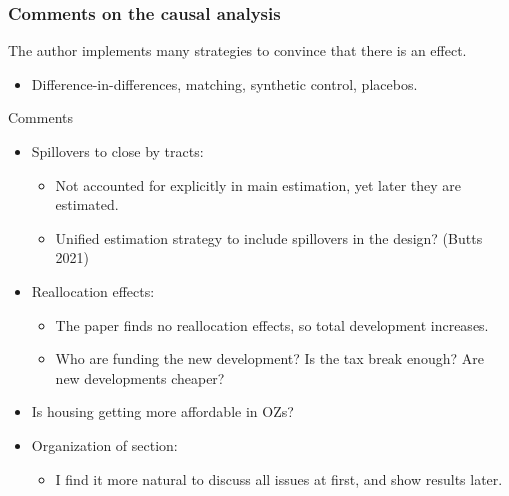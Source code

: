 \documentclass[aspectratio=169, t]{beamer}
\begin{document}
\begin{frame}
    \frametitle{Comments on the causal analysis}
    
    The author implements many strategies to convince that there is an effect.
    \begin{itemize}
        \item Difference-in-differences, matching, synthetic control, placebos.
    \end{itemize}

    \pause
    \vspace{2mm}
    Comments
    \begin{itemize}
        \vspace{1mm}
        \item Spillovers to close by tracts:
        \begin{itemize}
            \item Not accounted for explicitly in main estimation, yet later they are estimated.
            \item Unified estimation strategy to include spillovers in the design? (Butts 2021)
        \end{itemize}
        \pause
        \vspace{1mm}
        \item Reallocation effects:
        \begin{itemize}
            \item The paper finds no reallocation effects, so total development increases.
            \item Who are funding the new development? Is the tax break enough? Are new developments cheaper?
        \end{itemize}
        \pause
        \vspace{1mm}
        \item Is housing getting more affordable in OZs?
        \pause
        \vspace{1mm}
        \item Organization of section:
        \begin{itemize}
            \item I find it more natural to discuss all issues at first, and show results later.
        \end{itemize}
    \end{itemize}
\end{frame}
\end{document}

